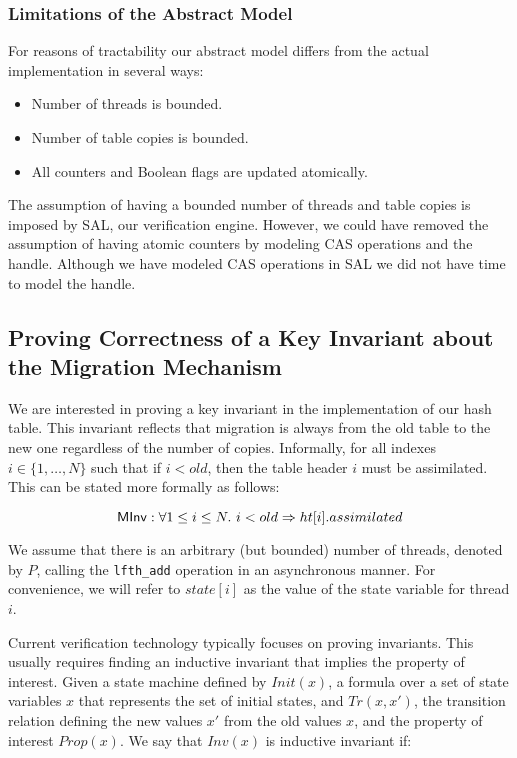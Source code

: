 \subsubsection{Limitations of the Abstract Model}

For reasons of tractability our abstract model differs from the actual
implementation in several ways:

\begin{itemize}
\item Number of threads is bounded.
\item Number of table copies is bounded.
\item All counters and Boolean flags are updated atomically.  
\end{itemize}

The assumption of having a bounded number of threads and table copies
is imposed by SAL, our verification engine. However, we could have
removed the assumption of having atomic counters by modeling CAS
operations and the handle. Although we have modeled CAS operations in
SAL we did not have time to model the handle.


\subsection{Proving Correctness of a Key Invariant about the Migration Mechanism}

We are interested in proving a key invariant in the implementation of
our hash table. This invariant reflects that migration is always from
the old table to the new one regardless of the number of
copies. Informally, for all indexes $i \in \{1, \ldots, N\}$ such that
if $i < old$, then the table header $i$ must be assimilated. This can be stated
more formally as follows:

  \[ \mathsf{MInv}: \forall 1 \leq i \leq N.~ i < old \Rightarrow \mbox{$ht[i]$}.assimilated \]

We assume that there is an arbitrary (but bounded) number of threads,
denoted by $P$, calling the \texttt{lfth\_add} operation in an
asynchronous manner. For convenience, we will refer to $state[i]$ as
the value of the state variable for thread $i$.


Current verification technology typically focuses on proving
invariants. This usually requires finding an inductive invariant that
implies the property of interest. Given a state machine defined by
$Init(x)$, a formula over a set of state variables $x$ that represents
the set of initial states, and $Tr(x,x')$, the transition relation
defining the new values $x'$ from the old values $x$, and the property
of interest $Prop(x)$. We say that $Inv(x)$ is inductive invariant if:

